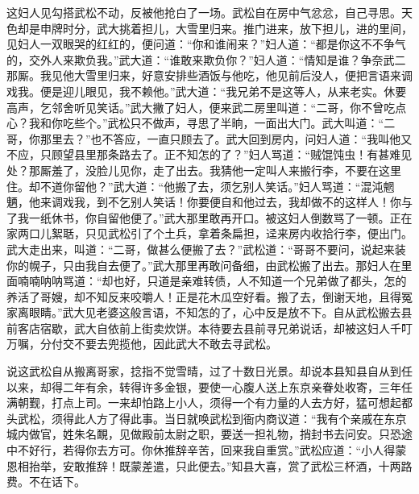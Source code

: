 这妇人见勾搭武松不动，反被他抢白了一场。武松自在房中气忿忿，自己寻思。天色却是申牌时分，武大挑着担儿，大雪里归来。推门进来，放下担儿，进的里间，见妇人一双眼哭的红红的，便问道：“你和谁闹来？”妇人道：“都是你这不不争气的，交外人来欺负我。”武大道：“谁敢来欺负你？”妇人道：“情知是谁？争奈武二那厮。我见他大雪里归来，好意安排些酒饭与他吃，他见前后没人，便把言语来调戏我。便是迎儿眼见，我不赖他。”武大道：“我兄弟不是这等人，从来老实。休要高声，乞邻舍听见笑话。”武大撇了妇人，便来武二房里叫道：“二哥，你不曾吃点心？我和你吃些个。”武松只不做声，寻思了半晌，一面出大门。武大叫道：“二哥，你那里去？”也不答应，一直只顾去了。武大回到房内，问妇人道：“我叫他又不应，只顾望县里那条路去了。正不知怎的了？”妇人骂道：“贼馄饨虫！有甚难见处？那厮羞了，没脸儿见你，走了出去。我猜他一定叫人来搬行李，不要在这里住。却不道你留他？”武大道：“他搬了去，须乞别人笑话。”妇人骂道：“混沌魍魉，他来调戏我，到不乞别人笑话！你要便自和他过去，我却做不的这样人！你与了我一纸休书，你自留他便了。”武大那里敢再开口。被这妇人倒数骂了一顿。正在家两口儿絮聒，只见武松引了个土兵，拿着条扁担，迳来房内收拾行李，便出门。武大走出来，叫道：“二哥，做甚么便搬了去？”武松道：“哥哥不要问，说起来装你的幌子，只由我自去便了。”武大那里再敢问备细，由武松搬了出去。那妇人在里面喃喃呐呐骂道：“却也好，只道是亲难转债，人不知道一个兄弟做了都头，怎的养活了哥嫂，却不知反来咬嚼人！正是花木瓜空好看。搬了去，倒谢天地，且得冤家离眼睛。”武大见老婆这般言语，不知怎的了，心中反是放不下。自从武松搬去县前客店宿歇，武大自依前上街卖炊饼。本待要去县前寻兄弟说话，却被这妇人千叮万嘱，分付交不要去兜揽他，因此武大不敢去寻武松。

说这武松自从搬离哥家，捻指不觉雪晴，过了十数日光景。却说本县知县自从到任以来，却得二年有余，转得许多金银，要使一心腹人送上东京亲眷处收寄，三年任满朝觐，打点上司。一来却怕路上小人，须得一个有力量的人去方好，猛可想起都头武松，须得此人方了得此事。当日就唤武松到衙内商议道：“我有个亲戚在东京城内做官，姓朱名靦，见做殿前太尉之职，要送一担礼物，捎封书去问安。只恐途中不好行，若得你去方可。你休推辞辛苦，回来我自重赏。”武松应道：“小人得蒙恩相抬举，安敢推辞！既蒙差遣，只此便去。”知县大喜，赏了武松三杯酒，十两路费。不在话下。

